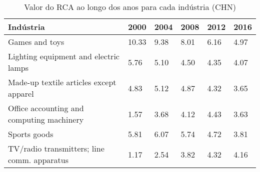 \begin{table}
\centering
\caption{Valor do RCA ao longo dos anos para cada indústria (CHN)}
\label{tab:ex3-tempo-CHN}
\begin{tabular}{p{6cm}p{1.5cm}p{1.5cm}p{1.5cm}p{1.5cm}p{1.5cm}}
\toprule
                                  Indústria &  2000 & 2004 & 2008 & 2012 & 2016 \\
\midrule
                             Games and toys & 10.33 & 9.38 & 8.01 & 6.16 & 4.97 \\
      Lighting equipment and electric lamps &  5.76 & 5.10 & 4.50 & 4.35 & 4.07 \\
    Made-up textile articles except apparel &  4.83 & 5.12 & 4.87 & 4.32 & 3.65 \\
  Office accounting and computing machinery &  1.57 & 3.68 & 4.12 & 4.43 & 3.63 \\
                               Sports goods &  5.81 & 6.07 & 5.74 & 4.72 & 3.81 \\
TV/radio transmitters; line comm. apparatus &  1.17 & 2.54 & 3.82 & 4.32 & 4.16 \\
\bottomrule
\end{tabular}
\end{table}
